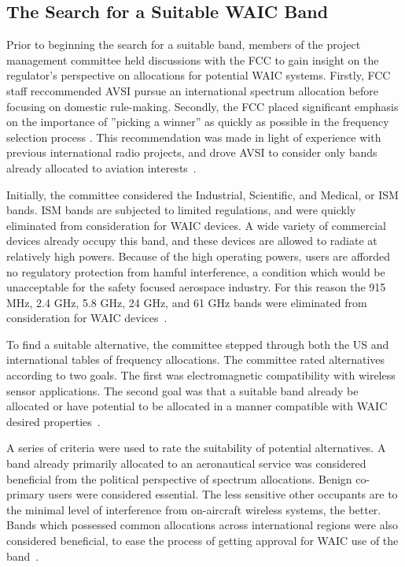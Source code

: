 \subsection{The Search for a Suitable WAIC Band}
Prior to beginning the search for a suitable band, members of the project management committee held discussions with the FCC to gain insight on the regulator's perspective on allocations for potential WAIC systems. Firstly, FCC staff reccommended AVSI pursue an international spectrum allocation before focusing on domestic rule-making. Secondly, the FCC placed significant emphasis on the importance of  ''picking a winner'' as quickly as possible in the frequency selection process . This recommendation was made in light of experience with previous international radio projects, and drove AVSI to consider only bands already allocated to aviation interests~\cite{ferrell_feasibility_2007}.    
 
Initially, the committee considered the Industrial, Scientific, and Medical, or ISM bands. ISM bands are subjected to limited regulations, and were quickly eliminated from consideration for WAIC devices. A wide variety of commercial devices already occupy this band, and these devices are allowed to radiate at relatively high powers. Because of the high operating powers, users are afforded no regulatory protection from hamful interference, a condition which would be unacceptable for the safety focused aerospace industry. For this reason the 915 MHz, 2.4 GHz, 5.8 GHz, 24 GHz, and 61 GHz bands were eliminated from consideration for WAIC devices~\cite{ferrell_feasibility_2007}. 


To find a suitable alternative, the committee stepped through both the US and international tables of frequency allocations. The committee rated alternatives according to two goals. The first was electromagnetic compatibility with wireless sensor applications. The second goal was that a suitable band already be allocated or have potential to be allocated in a manner compatible with WAIC desired properties~\cite{ferrell_feasibility_2007}. 

A series of criteria were used to rate the suitability of potential alternatives. A band already primarily allocated to an aeronautical service was considered beneficial from the political perspective of spectrum allocations. Benign co-primary users were considered essential. The less sensitive other occupants are to the minimal level of interference from on-aircraft wireless systems, the better. Bands which possessed common allocations across international regions were also considered beneficial, to ease the process of getting approval for WAIC use of the band~\cite{ferrell_feasibility_2007}. 


